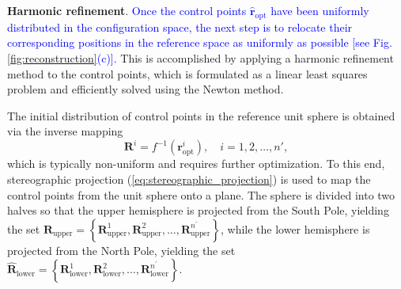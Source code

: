\documentclass[journal]{IEEEtran}
\theoremstyle{definition}
\begin{document}
\textbf{Harmonic refinement}. \textcolor{blue}{Once the control points \(\hat{\mathbf{r}}_\text{opt}\) have been uniformly distributed in the configuration space, the next step is to relocate their corresponding positions in the reference space as uniformly as possible [see Fig. \ref{fig:reconstruction}(c)].} This is accomplished by applying a harmonic refinement method to the control points, which is formulated as a linear least squares problem and efficiently solved using the Newton method.

The initial distribution of control points in the reference unit sphere is obtained via the inverse mapping
\begin{equation}
  \mathbf{R}^i = f^{-1}\left(\mathbf{r}^i_\text{opt}\right), \quad i=1,2,\dots,n',
  \label{eq:inverse_mapping}
\end{equation}
which is typically non-uniform and requires further optimization. To this end, stereographic projection (\ref{eq:stereographic_projection}) is used to map the control points from the unit sphere onto a plane. The sphere is divided into two halves so that the upper hemisphere is projected from the South Pole, yielding the set $\hat{\mathbf{R}}_\text{upper} = \left\{{\mathbf{R}}_\text{upper}^1,{\mathbf{R}}_\text{upper}^2,\dots,{\mathbf{R}}_\text{upper}^{n^\prime}\right\}$, while the lower hemisphere is projected from the North Pole, yielding the set $\hat{\mathbf{R}}_\text{lower} = \left\{{\mathbf{R}}_\text{lower}^1,{\mathbf{R}}_\text{lower}^2,\dots,{\mathbf{R}}_\text{lower}^{n^\prime}\right\}$.
\end{document}

